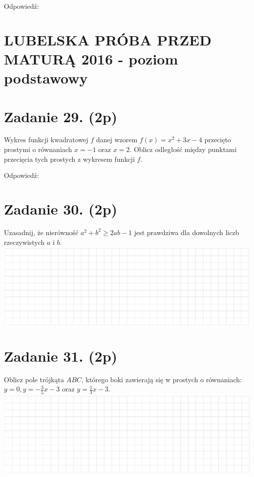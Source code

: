 \documentclass[10pt]{article}
\begin{document}
Odpowiedź:

\section*{LUBELSKA PRÓBA PRZED MATURĄ 2016 - poziom podstawowy}
\section*{Zadanie 29. (2p)}
Wykres funkcji kwadratowej \(f\) danej wzorem \(f(x)=x^{2}+3 x-4\) przecięto prostymi o równaniach \(x=-1\) oraz \(x=2\). Oblicz odległość między punktami przecięcia tych prostych z wykresem funkcji \(f\).

Odpowiedź:

\section*{Zadanie 30. (2p)}
Uzasadnij, że nierówność \(a^{2}+b^{2} \geq 2 a b-1\) jest prawdziwa dla dowolnych liczb rzeczywistych \(a\) i \(b\).\\
\includegraphics[max width=\textwidth, center]{2024_11_21_0213a2175f3206eefc55g-09(1)}

\section*{Zadanie 31. (2p)}
Oblicz pole trójkąta \(A B C\), którego boki zawierają się w prostych o równaniach: \(y=0, y=-\frac{3}{5} x-3\) oraz \(y=\frac{1}{3} x-3\).\\
\includegraphics[max width=\textwidth, center]{2024_11_21_0213a2175f3206eefc55g-09}
\end{document}
